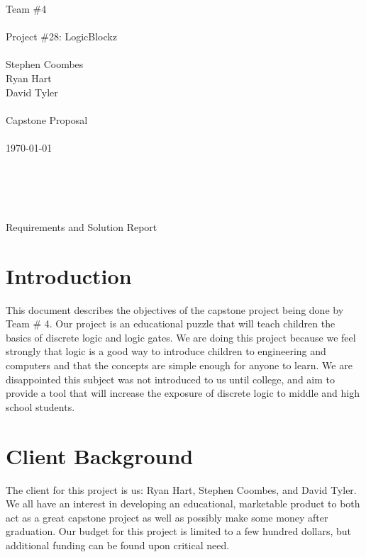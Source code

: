 \documentclass[12pt]{report}
\begin{document}

\noindent Team \#4 \\  \\
Project \#28: LogicBlockz \\ \\
Stephen Coombes \\
Ryan Hart \\
David Tyler \\ \\
Capstone Proposal \\ \\
\today \\ \\ \\ \\ \\
\centerline{Requirements and Solution Report}
\newpage


\section*{Introduction}

This document describes the objectives of the capstone project being done by Team \# 4. Our project is an educational puzzle that will teach children the basics of discrete logic and logic gates. We are doing this project because we feel strongly that logic is a good way to introduce children to engineering and computers and that the concepts are simple enough for anyone to learn. We are disappointed this subject was not introduced to us until college, and aim to provide a tool that will increase the exposure of discrete logic to middle and high school students.

\section*{Client Background}

The client for this project is us: Ryan Hart, Stephen Coombes, and David Tyler. We all have an interest in developing an educational, marketable product to both act as a great capstone project as well as possibly make some money after graduation. Our budget for this project is limited to a few hundred dollars, but additional funding can be found upon critical need.
\end{document}
